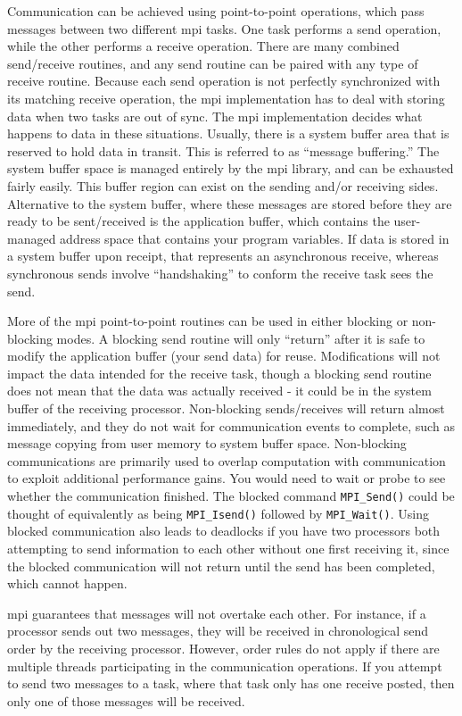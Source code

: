 \documentclass[10pt]{article}
\begin{document}
\begin{flushleft}
Communication can be achieved using point-to-point operations, which pass messages between two different \gls{mpi} tasks. One task performs a send operation, while the other performs a receive operation. There are many combined send/receive routines, and any send routine can be paired with any type of receive routine. Because each send operation is not perfectly synchronized with its matching receive operation, the \gls{mpi} implementation has to deal with storing data when two tasks are out of sync. The \gls{mpi} implementation decides what happens to data in these situations. Usually, there is a system buffer area that is reserved to hold data in transit. This is referred to as ``message buffering.'' The system buffer space is managed entirely by the \gls{mpi} library, and can be exhausted fairly easily. This buffer region can exist on the sending and/or receiving sides. Alternative to the system buffer, where these messages are stored before they are ready to be sent/received is the application buffer, which contains the user-managed address space that contains your program variables. If data is stored in a system buffer upon receipt, that represents an asynchronous receive, whereas synchronous sends involve ``handshaking'' to conform the receive task sees the send.

More of the \gls{mpi} point-to-point routines can be used in either blocking or non-blocking modes. A blocking send routine will only ``return'' after it is safe to modify the application buffer (your send data) for reuse. Modifications will not impact the data intended for the receive task, though a blocking send routine does not mean that the data was actually received - it could be in the system buffer of the receiving processor. Non-blocking sends/receives will return almost immediately, and they do not wait for communication events to complete, such as message copying from user memory to system buffer space. Non-blocking communications are primarily used to overlap computation with communication to exploit additional performance gains. You would need to wait or probe to see whether the communication finished. The blocked command {\tt MPI\_Send()} could be thought of equivalently as being {\tt MPI\_Isend()} followed by {\tt MPI\_Wait()}. Using blocked communication also leads to deadlocks if you have two processors both attempting to send information to each other without one first receiving it, since the blocked communication will not return until the send has been completed, which cannot happen.

\gls{mpi} guarantees that messages will not overtake each other. For instance, if a processor sends out two messages, they will be received in chronological send order by the receiving processor. However, order rules do not apply if there are multiple threads participating in the communication operations. If you attempt to send two messages to a task, where that task only has one receive posted, then only one of those messages will be received. 


\end{flushleft}
\end{document}
